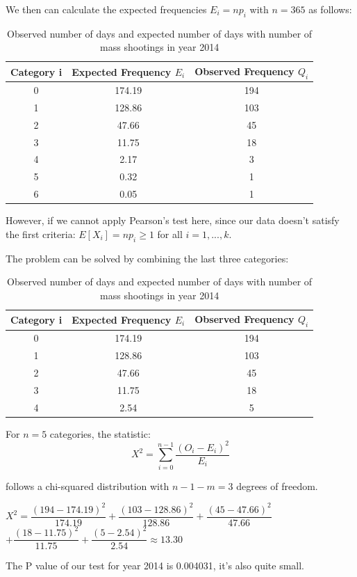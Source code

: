 \documentclass[12pt]{article}
\begin{document}
\par We then can calculate the expected frequencies $E_i=np_i$ with $n=365$ as follows:
\begin{table} [H]
\begin{center}
\begin{tabular*} {14cm} {@{\extracolsep{\fill} }ccc}
\toprule
Category i & Expected Frequency $E_i$ & Observed Frequency $Q_i$ \\
\midrule
0 & 174.19 & 194\\ \hline
1 & 128.86 & 103\\ \hline
2 & 47.66 & 45\\ \hline
3 & 11.75  & 18\\ \hline
4 & 2.17 &  3\\ \hline
5 & 0.32 &  1\\ \hline
6 & 0.05  & 1\\
\bottomrule
\end{tabular*}
\end{center}
\caption{Observed number of days and expected number of days with number of mass shootings in year 2014}
\end{table}
\par However, if we cannot apply Pearson's test here, since our data doesn't satisfy the first criteria: $E[X_i]=np_i\geq1$ for all $i=1,...,k$.
\par The problem can be solved by combining the last three categories:
\begin{table} [!htbp]
\begin{center}
\begin{tabular*} {14cm} {@{\extracolsep{\fill} }ccc}
\toprule
Category i & Expected Frequency $E_i$ & Observed Frequency $Q_i$ \\
\midrule
0 & 174.19 & 194\\ \hline
1 & 128.86 & 103\\ \hline
2 & 47.66 & 45\\ \hline
3 & 11.75  & 18\\ \hline
4 & 2.54 &  5\\
\bottomrule
\end{tabular*}
\end{center}
\caption{Observed number of days and expected number of days with number of mass shootings in year 2014}
\end{table}
\par For $n=5$ categories, the statistic:
\begin{equation*}
X^2=\sum_{i=0}^{n-1}\dfrac{(O_i-E_i)^2}{E_i}
\end{equation*}
\par follows a chi-squared distribution with $n-1-m=3$ degrees of freedom.
\begin{center}
$X^2=\dfrac{(194-174.19)^2}{174.19}+\dfrac{(103-128.86)^2}{128.86}+\dfrac{(45-47.66)^2}{47.66}$\\
$+\dfrac{(18-11.75)^2}{11.75}+\dfrac{(5-2.54)^2}{2.54}\approx13.30$
\end{center}
\par The P value of our test for year 2014 is 0.004031, it's also quite small.\\
\end{document}
